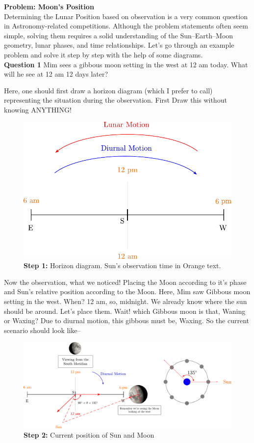 \documentclass[a4paper,12pt]{extarticle}
\begin{document}
\textsf{\textbf{\large Problem: Moon's Position}}\\

Determining the Lunar Position based on observation is a very common question in Astronomy-related competitions. Although the problem statements often seem simple, solving them requires a solid understanding of the Sun–Earth–Moon geometry, lunar phases, and time relationships. Let’s go through an example problem and solve it step by step with the help of some diagrams.\\

\textsf{\textbf{Question 1}} Mim sees a gibbous moon setting in the west at 12 am today. What will he see at 12 am 12 days later?

\begin{sol}
	Here, one should first draw a horizon diagram (which I prefer to call) representing the situation during the observation. First Draw this without knowing ANYTHING!
	
	\begin{figure}[H]
		\centering
		\includegraphics[width=0.5\linewidth]{moon_position1.pdf}
		\caption*{\textbf{Step 1:} Horizon diagram. Sun's observation time in Orange text.}
	\end{figure}
Now the observation, what we noticed! Placing the Moon according to it's phase and Sun's relative position according to the Moon. Here, Mim saw Gibbous moon setting in the west. When? 12 am, so, midnight. We already know where the sun should be around. Let's place them. Wait! which Gibbous moon is that, Waning or Waxing? Due to diurnal motion, this gibbous must be, Waxing. So the current scenario should look like--

	\begin{figure}[H]
	\centering
	\includegraphics[width=\linewidth]{moon_position2.pdf}
	\caption*{\textbf{Step 2:} Current position of Sun and Moon}
\end{figure}


\end{sol}
\end{document}
